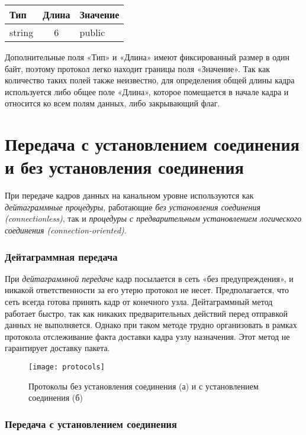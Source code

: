 \begin{table}[]
    \begin{tabular}{|l|l|l|}
        \hline
        \textbf{Тип} & \textbf{Длина}         & \textbf{Значение} \\ \hline
        string       & \multicolumn{1}{c|}{6} & public            \\ \hline
    \end{tabular}
\end{table}

Дополнительные поля «Тип» и «Длина» имеют фиксированный размер в один  байт, поэтому протокол легко находит границы поля «Значение».
Так как количество таких полей также неизвестно, для определения общей длины кадра используется либо общее поле «Длина», которое помещается в начале кадра и относится ко всем полям данных, либо закрывающий флаг.

\section{Передача с установлением соединения и без установления соединения}

При передаче кадров данных на канальном уровне используются как \emph{дейтаграммные процедуры}, работающие \emph{без установления соединения (connectionless)}, так и \emph{процедуры с предварительным установлением логического соединения (connection-oriented)}.

\subsubsection{Дейтаграммная передача}

При \emph{дейтаграммной передаче} кадр посылается в сеть «без предупреждения», и никакой ответственности за его утерю протокол не несет.
Предполагается, что сеть всегда готова принять кадр от конечного узла.
Дейтаграммный метод работает быстро, так как никаких предварительных действий перед отправкой данных не выполняется.
Однако при таком методе трудно организовать в рамках протокола отслеживание факта доставки кадра узлу назначения.
Этот метод не гарантирует доставку пакета.

\begin{figure}
    \centering
    \texttt{[image: protocols]}
    \caption{Протоколы без установления соединения (а) и с установлением соединения (б)}
    \label{fig:protocols}
\end{figure}

\subsubsection{Передача с установлением соединения}

